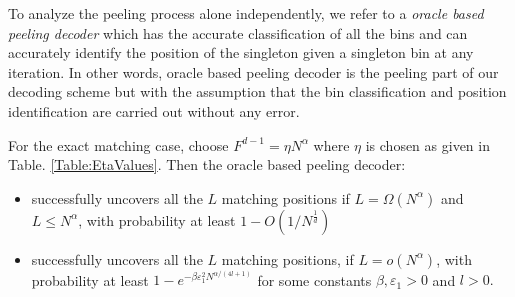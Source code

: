 To analyze the peeling process alone independently, we refer to a {\it oracle based peeling decoder} which has the accurate classification of all the bins and can accurately  identify the position of the singleton given a singleton bin at any iteration. In other words, oracle based peeling decoder is the peeling part of our decoding scheme but with the assumption that the bin classification and position identification are carried out without any error.
\begin{lemma}
For the exact matching case, choose $F^{d-1}=\eta N^\alpha$ where $\eta$ is chosen as given in Table. \ref{Table:EtaValues}. Then the oracle based peeling decoder:
\begin{itemize}
\item successfully uncovers all the $L$ matching positions if $L=\Omega(N^{\alpha})$ and $L\leq N^{\alpha}$, with probability at least $1-O(1/N^{\frac{1}{d}})$
\item successfully uncovers all the $L$ matching positions, if $L=o(N^{\alpha})$, with probability at least $1-e^{-\beta \varepsilon_1^2N^{\alpha/(4l+1)}}$ for some constants $\beta,\varepsilon_1>0$ and $l>0.$
\end{itemize}
\end{lemma}
